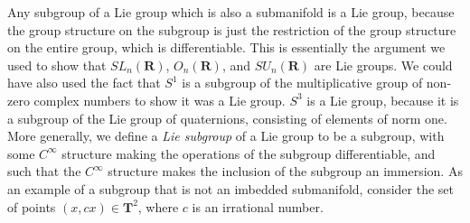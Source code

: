 Any subgroup of a Lie group which is also a submanifold is a Lie group, because the group structure on the subgroup is just the restriction of the group structure on the entire group, which is differentiable. This is essentially the argument we used to show that $SL_n(\mathbf{R})$, $O_n(\mathbf{R})$, and $SU_n(\mathbf{R})$ are Lie groups. We could have also used the fact that $S^1$ is a subgroup of the multiplicative group of non-zero complex numbers to show it was a Lie group. $S^3$ is a Lie group, because it is a subgroup of the Lie group of quaternions, consisting of elements of norm one. More generally, we define a \emph{Lie subgroup} of a Lie group to be a subgroup, with some $C^\infty$ structure making the operations of the subgroup differentiable, and such that the $C^\infty$ structure makes the inclusion of the subgroup an immersion. As an example of a subgroup that is not an imbedded submanifold, consider the set of points $(x,cx) \in \mathbf{T}^2$, where $c$ is an irrational number.


